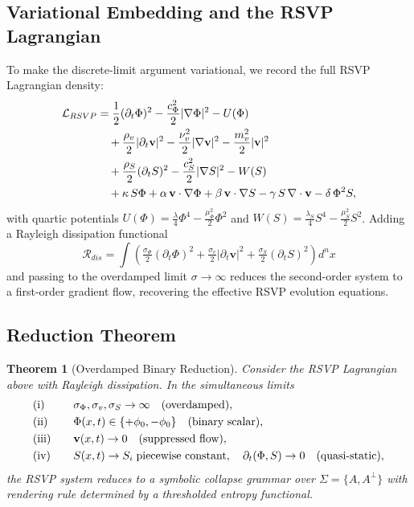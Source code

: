 \documentclass[12pt,a4paper]{article}
\theoremstyle{plain}
\newtheorem{theorem}{Theorem}
\theoremstyle{definition}
\theoremstyle{remark}
\begin{document}
\subsection{Variational Embedding and the RSVP Lagrangian}

To make the discrete-limit argument variational, we record the full
RSVP Lagrangian density:
\begin{align}
\mathcal{L}_{RSVP} &=
\frac{1}{2}(\partial_t\Phi)^2 - \frac{c_\Phi^2}{2}|\nabla\Phi|^2
- U(\Phi) \notag \\
&\quad + \frac{\rho_v}{2}|\partial_t\mathbf{v}|^2
- \frac{\nu_v^2}{2}|\nabla\mathbf{v}|^2
- \frac{m_v^2}{2}|\mathbf{v}|^2 \notag \\
&\quad + \frac{\rho_S}{2}(\partial_t S)^2
- \frac{c_S^2}{2}|\nabla S|^2 - W(S) \notag \\
&\quad + \kappa\,S\Phi + \alpha\,\mathbf{v}\cdot\nabla\Phi
+ \beta\,\mathbf{v}\cdot\nabla S
- \gamma\,S\,\nabla\cdot\mathbf{v}
- \delta\,\Phi^2 S,
\end{align}
with quartic potentials $U(\Phi) = \tfrac{\lambda}{4}\Phi^4 -
\tfrac{\mu_\Phi^2}{2}\Phi^2$ and $W(S) = \tfrac{\lambda_S}{4}S^4 -
\tfrac{\mu_S^2}{2}S^2$. Adding a Rayleigh dissipation functional
\[
\mathcal{R}_{dis} = \int\left(
\tfrac{\sigma_\Phi}{2}(\partial_t\Phi)^2
+ \tfrac{\sigma_v}{2}|\partial_t\mathbf{v}|^2
+ \tfrac{\sigma_S}{2}(\partial_t S)^2
\right)d^nx
\]
and passing to the overdamped limit $\sigma\to\infty$ reduces the
second-order system to a first-order gradient flow, recovering the
effective RSVP evolution equations.

\subsection{Reduction Theorem}

\begin{theorem}[Overdamped Binary Reduction]
\label{thm:symbolicreduction}
Consider the RSVP Lagrangian above with Rayleigh dissipation. In the
simultaneous limits
\begin{alignat*}{2}
&\textup{(i)}\quad && \sigma_\Phi,\sigma_v,\sigma_S \to \infty
  \quad\textup{(overdamped)}, \\
&\textup{(ii)}\quad && \Phi(x,t)\in\{+\phi_0,-\phi_0\}
  \quad\textup{(binary scalar)}, \\
&\textup{(iii)}\quad && \mathbf{v}(x,t)\to 0
  \quad\textup{(suppressed flow)}, \\
&\textup{(iv)}\quad && S(x,t)\to S_i\;\textup{piecewise constant},
  \quad\partial_t(\Phi,S)\to 0
  \quad\textup{(quasi-static)},
\end{alignat*}
the RSVP system reduces to a symbolic collapse grammar over
$\Sigma=\{A,A^\perp\}$ with rendering rule determined by a
thresholded entropy functional.
\end{theorem}
\end{document}
